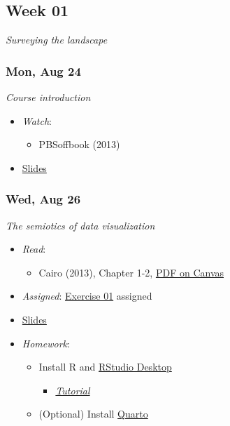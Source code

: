 \documentclass[
  letterpaper,
  DIV=11,
  numbers=noendperiod]{scrartcl}
\providecommand{\tightlist}{%
  \setlength{\itemsep}{0pt}\setlength{\parskip}{0pt}}
\begin{document}
\subsection*{Week 01}\label{week-01}

\emph{Surveying the landscape}

\subsubsection*{Mon, Aug 24}\label{mon-aug-24}

\emph{Course introduction}

\begin{itemize}
\tightlist
\item
  \emph{Watch}:

  \begin{itemize}
  \tightlist
  \item
    PBSoffbook (2013)
  \end{itemize}
\item
  \href{slides/wk-01-2026-08-24-course-intro.qmd}{Slides}
\end{itemize}

\subsubsection*{Wed, Aug 26}\label{wed-aug-26}

\emph{The semiotics of data visualization}

\begin{itemize}
\tightlist
\item
  \emph{Read}:

  \begin{itemize}
  \tightlist
  \item
    Cairo (2013), Chapter 1-2,
    \href{https://psu.instructure.com/courses/2484925/files?preview=193582601}{PDF
    on Canvas}
  \end{itemize}
\item
  \emph{Assigned}: \href{exercises/ex-01-figs-in-psych-sci.qmd}{Exercise
  01} {assigned}
\item
  \href{slides/wk-01-2026-08-26-semiotics-data-viz.qmd}{Slides}
\item
  \emph{Homework}:

  \begin{itemize}
  \tightlist
  \item
    Install R and \href{https://docs.posit.co/ide/user/}{RStudio
    Desktop}

    \begin{itemize}
    \tightlist
    \item
      \href{tutorials/tutorial-install-r-rstudio.qmd}{\emph{Tutorial}}
    \end{itemize}
  \item
    (Optional) Install
    \href{https://quarto.org/docs/get-started/}{Quarto}
  \end{itemize}
\end{itemize}
\end{document}
